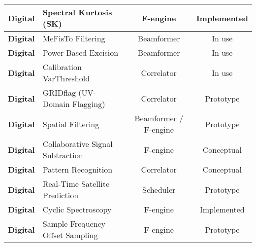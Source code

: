 \begin{table}
\begin{center}
{\begin{tabular}{|l|l|c|c|}
\textbf{Digital} & Spectral Kurtosis (SK) & F-engine & Implemented \\ \hline
\textbf{Digital} & MeFisTo Filtering & Beamformer & In use \\ \hline
\textbf{Digital} & Power-Based Excision & Beamformer & In use \\ \hline
\textbf{Digital} & Calibration VarThreshold & Correlator & In use \\ \hline
\textbf{Digital} & GRIDflag (UV-Domain Flagging) & Correlator & Prototype \\ \hline
\textbf{Digital} & Spatial Filtering & Beamformer / F-engine & Prototype \\ \hline
\textbf{Digital} & Collaborative Signal Subtraction & F-engine & Conceptual \\ \hline
\textbf{Digital} & Pattern Recognition & Correlator & Conceptual \\ \hline
\textbf{Digital} & Real-Time Satellite Prediction & Scheduler & Prototype \\ \hline
\textbf{Digital} & Cyclic Spectroscopy & F-engine & Implemented \\ \hline
\textbf{Digital} & Sample Frequency Offset Sampling & F-engine & Prototype \\ \hline
\end{tabular}
  }
 \end{center}
\end{table}








